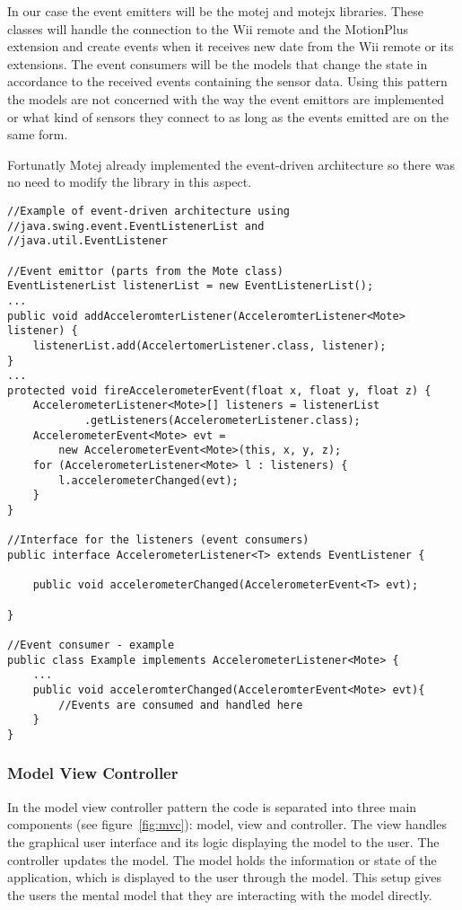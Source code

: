 In our case the event emitters will be the motej and motejx libraries. These classes will handle the connection to the Wii remote and the MotionPlus extension and create events when it receives new date from the Wii remote or its extensions. The event consumers will be the models that change the state in accordance to the received events containing the sensor data. Using this pattern the models are not concerned with the way the event emittors are implemented or what kind of sensors they connect to as long as the events emitted are on the same form.

Fortunatly Motej already implemented the event-driven architecture so there was no need to modify the library in this aspect.

\begin{lstlisting}
//Example of event-driven architecture using 
//java.swing.event.EventListenerList and 
//java.util.EventListener

//Event emittor (parts from the Mote class)
EventListenerList listenerList = new EventListenerList();
...
public void addAcceleromterListener(AcceleromterListener<Mote> listener) {
	listenerList.add(AccelertomerListener.class, listener);
}
...
protected void fireAccelerometerEvent(float x, float y, float z) {
	AccelerometerListener<Mote>[] listeners = listenerList
			.getListeners(AccelerometerListener.class);
	AccelerometerEvent<Mote> evt = 
		new AccelerometerEvent<Mote>(this, x, y, z);
	for (AccelerometerListener<Mote> l : listeners) {
		l.accelerometerChanged(evt);
	}
}

//Interface for the listeners (event consumers)
public interface AccelerometerListener<T> extends EventListener {

	public void accelerometerChanged(AccelerometerEvent<T> evt);

}

//Event consumer - example
public class Example implements AccelerometerListener<Mote> {
	...
	public void acceleromterChanged(AcceleromterEvent<Mote> evt){
		//Events are consumed and handled here
	}
}
\end{lstlisting}

\subsubsection{Model View Controller}
In the model view controller pattern the code is separated into three main components (see figure~\ref{fig:mvc}): model, view and controller. The view handles the graphical user interface and its logic displaying the model to the user. The controller updates the model. The model holds the information or state of the application, which is displayed to the user through the model. This setup gives the users the mental model that they are interacting with the model directly.

